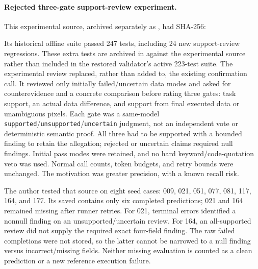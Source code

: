 \documentclass[11pt]{article}
\begin{document}
\paragraph{Rejected three-gate support-review experiment.}
This experimental source, archived separately as
, had SHA-256:
\begin{quote}
\small
{}
\end{quote}
Its historical offline suite passed 247 tests, including 24 new
support-review regressions. These extra tests are archived in
 against the experimental
source rather than included in the restored validator's active 223-test suite.
The experimental review replaced, rather than added to, the existing
confirmation call. It reviewed only initially failed/uncertain data
modes and asked for counterevidence and a concrete comparison before
rating three gates: task support, an actual data difference, and support
from final executed data or unambiguous pixels. Each gate was a
same-model \texttt{supported}/\texttt{unsupported}/\texttt{uncertain}
judgment, not an independent vote or deterministic semantic proof.
All three had to be supported with a bounded finding to retain the
allegation; rejected or uncertain claims required null findings.
Initial pass modes were retained, and no hard keyword/code-quotation
veto was used. Normal call counts, token budgets, and retry bounds were
unchanged. The motivation was greater precision, with a known recall risk.

The author tested that source on eight seed cases: 009, 021, 051, 077,
081, 117, 164, and 177. Its saved
 contains
only six completed predictions; 021 and 164 remained missing after
runner retries. For 021, terminal errors identified a nonnull finding
on an unsupported/uncertain review. For 164, an all-supported review
did not supply the required exact four-field finding. The raw failed
completions were not stored, so the latter cannot be narrowed to a null
finding versus incorrect/missing fields. Neither missing evaluation is
counted as a clean prediction or a new reference execution failure.
\end{document}
